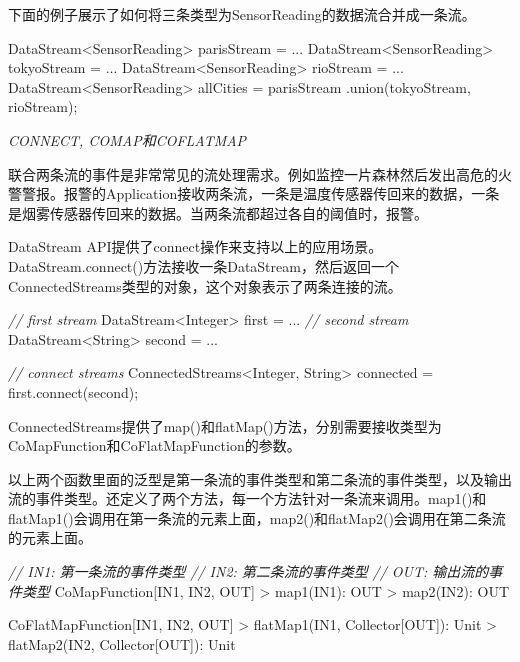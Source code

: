 \documentclass[cn,11pt,chinese]{elegantbook}
\newenvironment{Shaded}{}{}
\newcommand{\BuiltInTok}[1]{#1}
\newcommand{\CommentTok}[1]{\textcolor[rgb]{0.38,0.63,0.69}{\textit{#1}}}
\newcommand{\FunctionTok}[1]{\textcolor[rgb]{0.02,0.16,0.49}{#1}}
\newcommand{\NormalTok}[1]{#1}
\begin{document}
下面的例子展示了如何将三条类型为SensorReading的数据流合并成一条流。

\begin{Shaded}
\begin{Highlighting}[]
\NormalTok{DataStream\textless{}SensorReading\textgreater{} parisStream = ...}
\NormalTok{DataStream\textless{}SensorReading\textgreater{} tokyoStream = ...}
\NormalTok{DataStream\textless{}SensorReading\textgreater{} rioStream = ...}
\NormalTok{DataStream\textless{}SensorReading\textgreater{} allCities = parisStream}
\NormalTok{  .}\FunctionTok{union}\NormalTok{(tokyoStream, rioStream);}
\end{Highlighting}
\end{Shaded}

\emph{CONNECT, COMAP和COFLATMAP}

联合两条流的事件是非常常见的流处理需求。例如监控一片森林然后发出高危的火警警报。报警的Application接收两条流，一条是温度传感器传回来的数据，一条是烟雾传感器传回来的数据。当两条流都超过各自的阈值时，报警。

DataStream
API提供了connect操作来支持以上的应用场景。DataStream.connect()方法接收一条DataStream，然后返回一个ConnectedStreams类型的对象，这个对象表示了两条连接的流。

\begin{Shaded}
\begin{Highlighting}[]
\CommentTok{// first stream}
\NormalTok{DataStream\textless{}}\BuiltInTok{Integer}\NormalTok{\textgreater{} first = ...}
\CommentTok{// second stream}
\NormalTok{DataStream\textless{}}\BuiltInTok{String}\NormalTok{\textgreater{} second = ...}

\CommentTok{// connect streams}
\NormalTok{ConnectedStreams\textless{}}\BuiltInTok{Integer}\NormalTok{, }\BuiltInTok{String}\NormalTok{\textgreater{} connected = first.}\FunctionTok{connect}\NormalTok{(second);}
\end{Highlighting}
\end{Shaded}

ConnectedStreams提供了map()和flatMap()方法，分别需要接收类型为CoMapFunction和CoFlatMapFunction的参数。

以上两个函数里面的泛型是第一条流的事件类型和第二条流的事件类型，以及输出流的事件类型。还定义了两个方法，每一个方法针对一条流来调用。map1()和flatMap1()会调用在第一条流的元素上面，map2()和flatMap2()会调用在第二条流的元素上面。

\begin{Shaded}
\begin{Highlighting}[]
\CommentTok{// IN1: 第一条流的事件类型}
\CommentTok{// IN2: 第二条流的事件类型}
\CommentTok{// OUT: 输出流的事件类型}
\NormalTok{CoMapFunction[IN1, IN2, OUT]}
\NormalTok{    \textgreater{} }\FunctionTok{map1}\NormalTok{(IN1): OUT}
\NormalTok{    \textgreater{} }\FunctionTok{map2}\NormalTok{(IN2): OUT}

\NormalTok{CoFlatMapFunction[IN1, IN2, OUT]}
\NormalTok{    \textgreater{} }\FunctionTok{flatMap1}\NormalTok{(IN1, Collector[OUT]): Unit}
\NormalTok{    \textgreater{} }\FunctionTok{flatMap2}\NormalTok{(IN2, Collector[OUT]): Unit}
\end{Highlighting}
\end{Shaded}
\end{document}
